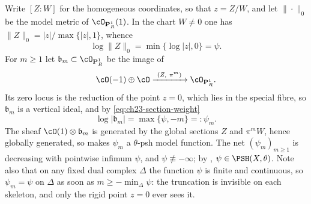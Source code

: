 \begin{example}
\label{ex:ch23-pole-model-check}
Write \([Z:W]\) for the homogeneous coordinates, so that \(z=Z/W\), and let
\(\|\cdot\|_0\) be the model metric of \(\cO_{\mathbf P^1_R}(1)\).  In the
chart \(W\ne0\) one has \(\|Z\|_0=|z|/\max\{|z|,1\}\), whence
\begin{equation}\label{eq:ch23-section-weight}
 \log\|Z\|_0=\min\{\log|z|,0\}=\psi .
\end{equation}
For \(m\geq1\) let \(\mathfrak b_m\subset\cO_{\mathbf P^1_R}\) be the image
of
\[
 \cO(-1)\oplus\cO
 \xrightarrow{\ (Z,\ \pi^m)\ }
 \cO_{\mathbf P^1_R}.
\]
Its zero locus is the reduction of the point \(z=0\), which lies in the
special fibre, so \(\mathfrak b_m\) is a vertical ideal, and by
\eqref{eq:ch23-section-weight}
\begin{equation}\label{eq:ch23-truncated-pole}
 \log|\mathfrak b_m|=\max\{\psi,-m\}=:\psi_m .
\end{equation}
The sheaf \(\cO(1)\otimes\mathfrak b_m\) is generated by the global sections
\(Z\) and \(\pi^mW\), hence globally generated, so
 makes \(\psi_m\) a \(\theta\)-psh model
function.  The net \((\psi_m)_{m\geq1}\) is decreasing with pointwise
infimum \(\psi\), and \(\psi\not\equiv-\infty\); by
, \(\psi\in\PSH(X,\theta)\).  Note also
that on any fixed dual complex \(\Delta\) the function \(\psi\) is finite and
continuous, so \(\psi_m=\psi\) on \(\Delta\) as soon as
\(m\geq-\min_\Delta\psi\): the truncation is invisible on each skeleton, and
only the rigid point \(z=0\) ever sees it.


\end{example}
